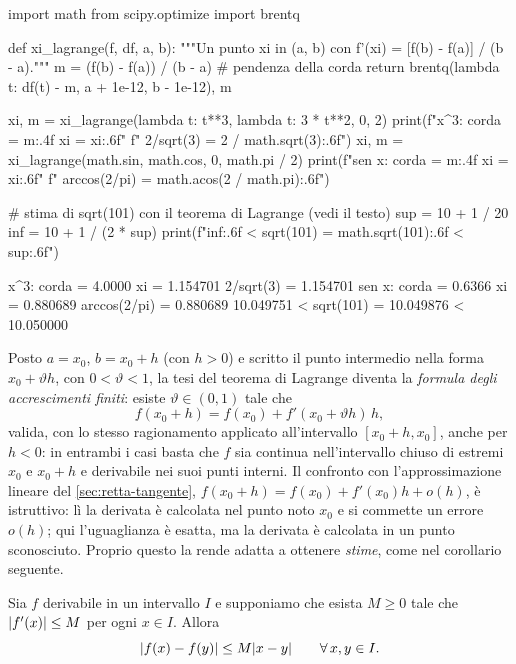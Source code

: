 \begin{python}
import math
from scipy.optimize import brentq

def xi_lagrange(f, df, a, b):
    """Un punto xi in (a, b) con f'(xi) = [f(b) - f(a)] / (b - a)."""
    m = (f(b) - f(a)) / (b - a)          # pendenza della corda
    return brentq(lambda t: df(t) - m, a + 1e-12, b - 1e-12), m

xi, m = xi_lagrange(lambda t: t**3, lambda t: 3 * t**2, 0, 2)
print(f"x^3:   corda = {m:.4f}   xi = {xi:.6f}"
      f"   2/sqrt(3)    = {2 / math.sqrt(3):.6f}")
xi, m = xi_lagrange(math.sin, math.cos, 0, math.pi / 2)
print(f"sen x: corda = {m:.4f}   xi = {xi:.6f}"
      f"   arccos(2/pi) = {math.acos(2 / math.pi):.6f}")

# stima di sqrt(101) con il teorema di Lagrange (vedi il testo)
sup = 10 + 1 / 20
inf = 10 + 1 / (2 * sup)
print(f"{inf:.6f} < sqrt(101) = {math.sqrt(101):.6f} < {sup:.6f}")
\end{python}
\begin{risultato}
x^3:   corda = 4.0000   xi = 1.154701   2/sqrt(3)    = 1.154701
sen x: corda = 0.6366   xi = 0.880689   arccos(2/pi) = 0.880689
10.049751 < sqrt(101) = 10.049876 < 10.050000
\end{risultato}

Posto $a=x_{0}$, $b=x_{0}+h$ (con $h>0$) e scritto il punto intermedio nella forma
$x_{0}+\vartheta h$, con $0<\vartheta<1$, la tesi del teorema di Lagrange diventa la
\emph{formula degli accrescimenti finiti}: esiste $\vartheta\in(0,1)$ tale che
\begin{equation}\label{eq:accrescimenti-finiti}
  f(x_{0}+h)=f(x_{0})+f'(x_{0}+\vartheta h)\,h ,
\end{equation}
valida, con lo stesso ragionamento applicato all'intervallo $[x_{0}+h,x_{0}]$, anche
per $h<0$: in entrambi i casi basta che $f$ sia continua nell'intervallo chiuso di
estremi $x_{0}$ e $x_{0}+h$ e derivabile nei suoi punti interni. Il confronto con
l'approssimazione lineare del \cref{sec:retta-tangente},
$f(x_{0}+h)=f(x_{0})+f'(x_{0})h+o(h)$, è istruttivo: lì la derivata è calcolata nel
punto noto $x_{0}$ e si commette un errore $o(h)$; qui l'uguaglianza è esatta, ma la
derivata è calcolata in un punto sconosciuto. Proprio questo la rende adatta a
ottenere \emph{stime}, come nel corollario seguente.

\begin{corollario}\label{cor:lipschitz}
Sia $f$ derivabile in un intervallo $I$ e supponiamo che esista $M\ge0$ tale che
$\lvert f'(x)\rvert\le M$ per ogni $x\in I$. Allora
\begin{equation}\label{eq:lipschitz}
  \lvert f(x)-f(y)\rvert\le M\lvert x-y\rvert \qquad\forall\, x,y\in I .
\end{equation}
\end{corollario}

